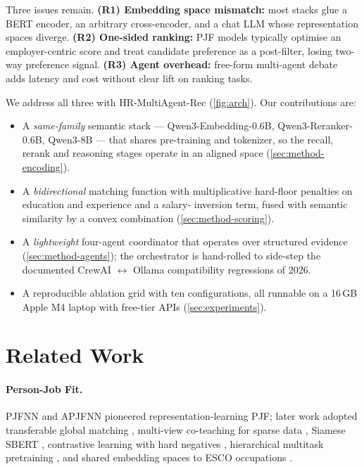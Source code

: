 \documentclass[11pt]{article}
\begin{document}
Three issues remain. \textbf{(R1) Embedding space mismatch:} most stacks
glue a BERT encoder, an arbitrary cross-encoder, and a chat LLM whose
representation spaces diverge. \textbf{(R2) One-sided ranking:} PJF models
typically optimise an employer-centric score and treat candidate preference
as a post-filter, losing two-way preference signal. \textbf{(R3) Agent
overhead:} free-form multi-agent debate adds latency and cost without
clear lift on ranking tasks.

We address all three with HR-MultiAgent-Rec
(\cref{fig:arch}). Our contributions are:
\begin{itemize}
\item A \emph{same-family} semantic stack — Qwen3-Embedding-0.6B,
      Qwen3-Reranker-0.6B, Qwen3-8B — that shares pre-training and
      tokenizer, so the recall, rerank and reasoning stages operate in
      an aligned space (\cref{sec:method-encoding}).
\item A \emph{bidirectional} matching function with multiplicative
      hard-floor penalties on education and experience and a salary-
      inversion term, fused with semantic similarity by a convex
      combination (\cref{sec:method-scoring}).
\item A \emph{lightweight} four-agent coordinator that operates over
      structured evidence (\cref{sec:method-agents}); the orchestrator
      is hand-rolled to side-step the documented CrewAI $\leftrightarrow$
      Ollama compatibility regressions of 2026.
\item A reproducible ablation grid with ten configurations, all runnable
      on a 16\,GB Apple M4 laptop with free-tier APIs
      (\cref{sec:experiments}).
\end{itemize}

\section{Related Work}
\label{sec:related}

\paragraph{Person-Job Fit.} PJFNN \citep{Zhu2018PJFNN} and APJFNN
\citep{Qin2018APJFNN} pioneered representation-learning PJF; later work
adopted transferable global matching \citep{Bian2019DomainPJF},
multi-view co-teaching for sparse data \citep{Bian2020MultiView},
Siamese SBERT \citep{Lavi2021ConSultantBERT}, contrastive learning with
hard negatives \citep{Yu2024ConFit,Yu2025ConFitV2}, hierarchical
multitask pretraining \citep{Cao2024TAROT}, and shared embedding spaces
to ESCO occupations \citep{Rosenberger2025CareerBERT}.
\end{document}
